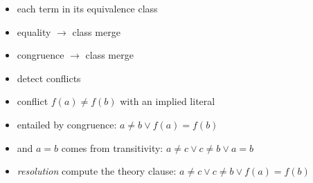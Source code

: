 \documentclass[svgnames,table,mathserif]{beamer}
\begin{document}
\begin{frame}
\begin{minipage}{.4\textwidth}
\begin{center}
%
%
  \end{center}
\end{minipage}%
\begin{minipage}{.55\textwidth}
\small
\begin{itemize}
\item<2-> each term in its equivalence class
\item<3-> equality $\longrightarrow$ class merge
\item<5-> congruence $\longrightarrow$ class merge
\item<6-> detect conflicts
\end{itemize}
\end{minipage}

\vspace*{10pt}

\vspace*{10pt}
{\small
\begin{itemize}
\item<9-> conflict $f(a) \neq f(b)$ with an implied literal
\item<10-> entailed by congruence: $a \neq b \vee f(a) = f(b)$
\item<11-> and $a = b$ comes from transitivity: $a \neq c \vee c \neq b \vee a = b$
\item<12-> \emph{resolution} compute the theory clause: $a \neq c \vee c \neq b \vee f(a) = f(b)$
\end{itemize}}


\end{frame}
\end{document}
